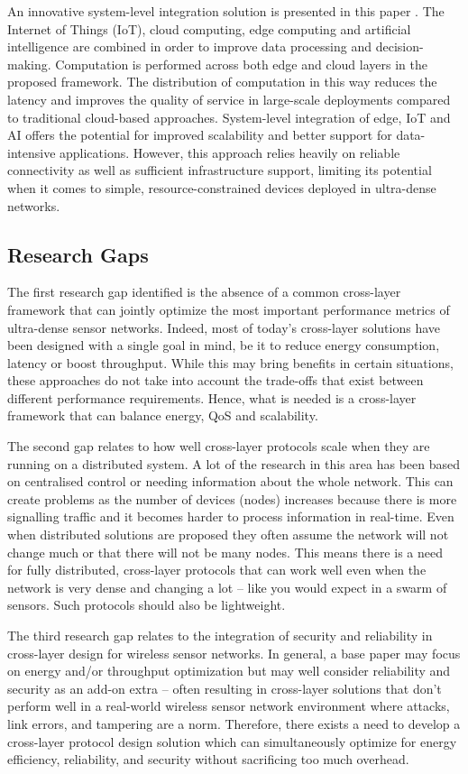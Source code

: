 \documentclass[a4paper,fleqn]{cas-dc}
\numberwithin{equation}{section}
\begin{document}
An innovative system-level integration solution is presented in this paper \cite{Ficili2025}. The Internet of Things (IoT), cloud computing, edge computing and artificial intelligence are combined in order to improve data processing and decision-making. Computation is performed across both edge and cloud layers in the proposed framework. The distribution of computation in this way reduces the latency and improves the quality of service in large-scale deployments compared to traditional cloud-based approaches. System-level integration of edge, IoT and AI offers the potential for improved scalability and better support for data-intensive applications. However, this approach relies heavily on reliable connectivity as well as sufficient infrastructure support, limiting its potential when it comes to simple, resource-constrained devices deployed in ultra-dense networks.

\subsection{Research Gaps}

The first research gap identified is the absence of a common cross-layer framework that can jointly optimize the most important performance metrics of ultra-dense sensor networks. Indeed, most of today’s cross-layer solutions have been designed with a single goal in mind, be it to reduce energy consumption, latency or boost throughput. While this may bring benefits in certain situations, these approaches do not take into account the trade-offs that exist between different performance requirements. Hence, what is needed is a cross-layer framework that can balance energy, QoS and scalability.

The second gap relates to how well cross-layer protocols scale when they are running on a distributed system. A lot of the research in this area has been based on centralised control or needing information about the whole network. This can create problems as the number of devices (nodes) increases because there is more signalling traffic and it becomes harder to process information in real-time. Even when distributed solutions are proposed they often assume the network will not change much or that there will not be many nodes. This means there is a need for fully distributed, cross-layer protocols that can work well even when the network is very dense and changing a lot – like you would expect in a swarm of sensors. Such protocols should also be lightweight.

The third research gap relates to the integration of security and reliability in cross-layer design for wireless sensor networks. In general, a base paper may focus on energy and/or throughput optimization but may well consider reliability and security as an add-on extra – often resulting in cross-layer solutions that don’t perform well in a real-world wireless sensor network environment where attacks, link errors, and tampering are a norm. Therefore, there exists a need to develop a cross-layer protocol design solution which can simultaneously optimize for energy efficiency, reliability, and security without sacrificing too much overhead.
\end{document}
